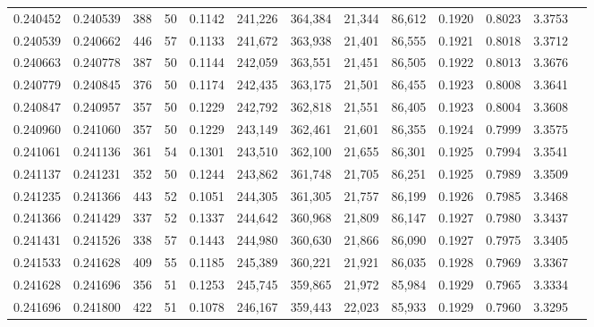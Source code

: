 \begin{tabular}{rrrrrrrrrrrrr}
0.240452 & 0.240539 &   388 &  50 &                                     0.1142 & 241,226 & 364,384 &  21,344 &  86,612 & 0.1920 & 0.8023 & 3.3753 \\
0.240539 & 0.240662 &   446 &  57 &                                     0.1133 & 241,672 & 363,938 &  21,401 &  86,555 & 0.1921 & 0.8018 & 3.3712 \\
0.240663 & 0.240778 &   387 &  50 &                                     0.1144 & 242,059 & 363,551 &  21,451 &  86,505 & 0.1922 & 0.8013 & 3.3676 \\
0.240779 & 0.240845 &   376 &  50 &                                     0.1174 & 242,435 & 363,175 &  21,501 &  86,455 & 0.1923 & 0.8008 & 3.3641 \\
0.240847 & 0.240957 &   357 &  50 &                                     0.1229 & 242,792 & 362,818 &  21,551 &  86,405 & 0.1923 & 0.8004 & 3.3608 \\
0.240960 & 0.241060 &   357 &  50 &                                     0.1229 & 243,149 & 362,461 &  21,601 &  86,355 & 0.1924 & 0.7999 & 3.3575 \\
0.241061 & 0.241136 &   361 &  54 &                                     0.1301 & 243,510 & 362,100 &  21,655 &  86,301 & 0.1925 & 0.7994 & 3.3541 \\
0.241137 & 0.241231 &   352 &  50 &                                     0.1244 & 243,862 & 361,748 &  21,705 &  86,251 & 0.1925 & 0.7989 & 3.3509 \\
0.241235 & 0.241366 &   443 &  52 &                                     0.1051 & 244,305 & 361,305 &  21,757 &  86,199 & 0.1926 & 0.7985 & 3.3468 \\
0.241366 & 0.241429 &   337 &  52 &                                     0.1337 & 244,642 & 360,968 &  21,809 &  86,147 & 0.1927 & 0.7980 & 3.3437 \\
0.241431 & 0.241526 &   338 &  57 &                                     0.1443 & 244,980 & 360,630 &  21,866 &  86,090 & 0.1927 & 0.7975 & 3.3405 \\
0.241533 & 0.241628 &   409 &  55 &                                     0.1185 & 245,389 & 360,221 &  21,921 &  86,035 & 0.1928 & 0.7969 & 3.3367 \\
0.241628 & 0.241696 &   356 &  51 &                                     0.1253 & 245,745 & 359,865 &  21,972 &  85,984 & 0.1929 & 0.7965 & 3.3334 \\
0.241696 & 0.241800 &   422 &  51 &                                     0.1078 & 246,167 & 359,443 &  22,023 &  85,933 & 0.1929 & 0.7960 & 3.3295 \\

\end{tabular}
